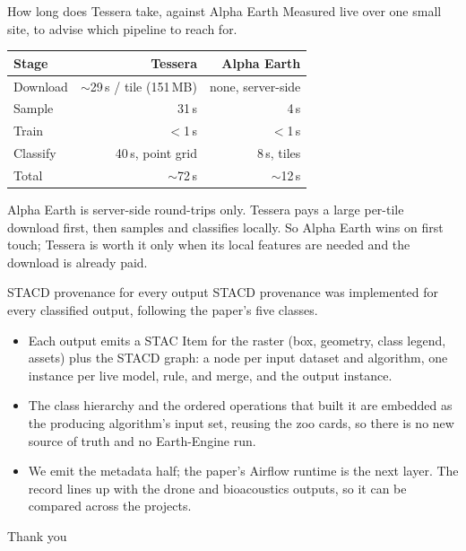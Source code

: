 \documentclass[aspectratio=169]{beamer}
\begin{document}
\begin{frame}{How long does Tessera take, against Alpha Earth}
Measured live over one small site, to advise which pipeline to reach for.
\vspace{2mm}
\centering
\begin{tabular}{lrr}
\toprule
Stage & Tessera & Alpha Earth \\
\midrule
Download & $\sim$29\,s / tile (151\,MB) & none, server-side \\
Sample & 31\,s & 4\,s \\
Train & $<$1\,s & $<$1\,s \\
Classify & 40\,s, point grid & 8\,s, tiles \\
\midrule
Total & $\sim$72\,s & $\sim$12\,s \\
\bottomrule
\end{tabular}
\vspace{2mm}
\begin{flushleft}\small
Alpha Earth is server-side round-trips only. Tessera pays a large per-tile download first, then samples
and classifies locally. So Alpha Earth wins on first touch; Tessera is worth it only when its local
features are needed and the download is already paid.
\end{flushleft}
\end{frame}

\begin{frame}{STACD provenance for every output}
STACD provenance was implemented for every classified output, following the paper's five classes.
\begin{itemize}\small
  \item Each output emits a STAC Item for the raster (box, geometry, class legend, assets) plus the
  STACD graph: a node per input dataset and algorithm, one instance per live model, rule, and merge,
  and the output instance.
  \item The class hierarchy and the ordered operations that built it are embedded as the producing
  algorithm's input set, reusing the zoo cards, so there is no new source of truth and no
  Earth-Engine run.
  \item We emit the metadata half; the paper's Airflow runtime is the next layer. The record lines up
  with the drone and bioacoustics outputs, so it can be compared across the projects.
\end{itemize}
\end{frame}

\begin{frame}
\centering
\vspace{1.5cm}
{\Large Thank you}
\vspace{0.5cm}


\end{frame}
\end{document}
